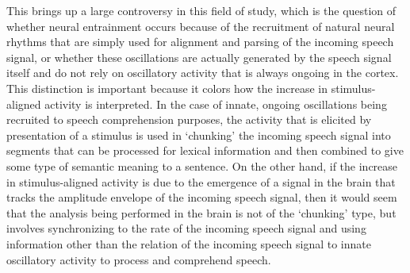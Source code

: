 \documentclass[titlepage]{article}
\begin{document}
    This brings up a large controversy in this field of study, which is the
    question of whether neural entrainment occurs because of the recruitment of
    natural neural rhythms that are simply used for alignment and parsing of the
    incoming speech signal, or whether these oscillations are actually
    generated by the speech signal itself and do not rely on oscillatory
    activity that is always ongoing in the cortex. This distinction is
    important because it colors how the increase in stimulus-aligned activity
    is interpreted. In the case of innate, ongoing oscillations being recruited
    to speech comprehension purposes, the activity that is elicited by
    presentation of a stimulus is used in `chunking' the incoming speech signal
    into segments that can be processed for lexical information and then
    combined to give some type of semantic meaning to a sentence. On the other
    hand, if the increase in stimulus-aligned activity is due to the
    emergence of a signal in the brain that tracks the amplitude envelope of
    the incoming speech signal, then it would seem that the analysis being
    performed in the brain is not of the `chunking' type, but involves
    synchronizing to the rate of the incoming speech signal and using
    information other than the relation of the incoming speech signal to
    innate oscillatory activity to process and comprehend speech.



\end{document}

